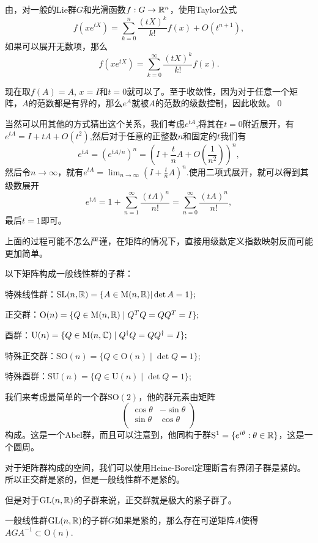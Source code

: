 \proof 由，对一般的Lie群$G$和光滑函数$f:G\to \mathbb{R}^n$，使用Taylor公式
\[
	f(xe^{tX})=\sum_{k=0}^n\frac{(tX)^{k}}{k!}f(x)+O(t^{n+1}),
\]
如果可以展开无数项，那么
\[
	f(xe^{tX})=\sum_{k=0}^\infty\frac{(tX)^{k}}{k!}f(x).
\]

现在取$f(A)=A$, $x=I$和$t=0$就可以了。至于收敛性，因为对于任意一个矩阵，$A$的范数都是有界的，那么$e^A$就被$A$的范数的级数控制，因此收敛。\qed

当然可以用其他的方式猜出这个关系，我们考虑$e^{tA}$,将其在$t=0$附近展开，有$e^{tA}=I+tA+O(t^2)$,然后对于任意的正整数$n$和固定的$t$我们有
\[
	e^{tA}=\left(e^{tA/n}\right)^n=\left(I+\frac{t}{n}A+O\left(\frac{1}{n^2}\right)\right)^n,
\]
然后令$n\to\infty$，就有$e^{tA}=\lim_{n\to\infty}\left(I+\frac{t}{n}A\right)^n$.使用二项式展开，就可以得到其级数展开
\[
	e^{tA}=1+\sum_{n=1}^\infty \frac{(tA)^n}{n!}=\sum_{n=0}^\infty \frac{(tA)^n}{n!},
\]
最后$t=1$即可。

上面的过程可能不怎么严谨，在矩阵的情况下，直接用级数定义指数映射反而可能更加简单。

\para 以下矩阵构成一般线性群的子群：

 特殊线性群：$\mathrm{SL}(n,\mathbb{R})=\{A\in \mathrm{M}(n,\mathbb{R})|\det A=1\};$

 正交群：$\mathrm{O}(n) = \{ Q \in \mathrm{M}(n,\mathbb{R}) \mid Q^T Q = Q Q^T = I \};$

 酉群：$\mathrm{U}(n) = \{ Q \in \mathrm{M}(n,\mathbb{C}) \mid Q^\dag Q = Q Q^\dag = I \};$

 特殊正交群：$\mathrm{SO}(n) =\{ Q \in \mathrm{O}(n) \mid \det Q=1 \};$

 特殊酉群：$\mathrm{SU}(n) =\{ Q \in \mathrm{U}(n) \mid \det Q=1 \};$

我们来考虑最简单的一个群$\mathrm{SO}(2)$，他的群元素由矩阵
\[
	\begin{pmatrix}
	\cos \theta&-\sin \theta\\
	\sin \theta&\cos \theta\\
	\end{pmatrix}
\]
构成。这是一个Abel群，而且可以注意到，他同构于群$\mathrm{S}^1=\{e^{i\theta}:\theta\in\mathbb{R}\}$，这是一个圆周。

\pro 对于矩阵群构成的空间，我们可以使用Heine-Borel定理断言有界闭子群是紧的。所以正交群是紧的，但是一般线性群不是紧的。

但是对于$\mathrm{GL}(n,\mathbb{R})$的子群来说，正交群就是极大的紧子群了。

\pro 一般线性群$\mathrm{GL}(n,\mathbb{R})$的子群$G$如果是紧的，那么存在可逆矩阵$A$使得$AGA^{-1}\subset \mathrm{O}(n)$.

